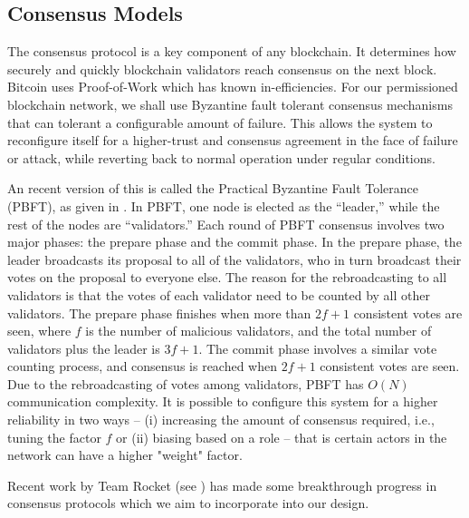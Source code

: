 \subsection{Consensus Models}

The consensus protocol is a key component of any blockchain. It determines how securely and
quickly blockchain validators reach consensus on the next block. Bitcoin uses Proof-of-Work which
has known in-efficiencies. For our permissioned blockchain network, we shall use Byzantine fault tolerant 
consensus mechanisms that can tolerant a configurable amount of failure. This allows the system
to reconfigure itself for a higher-trust and consensus agreement in the face of failure or attack, while
reverting back to normal operation under regular conditions.

An recent version of this is called the Practical Byzantine Fault Tolerance (PBFT), as given in \cite{castro1999}. In
PBFT, one node is elected as the “leader,” while the rest of the nodes are “validators.” Each round of PBFT consensus
involves two major phases: the prepare phase and the commit phase. In the prepare phase, the leader broadcasts its
proposal to all of the validators, who in turn broadcast their votes on the proposal to everyone else. The reason for
the rebroadcasting to all validators is that the votes of each validator need to be counted by all other validators. The
prepare phase finishes when more than $2f + 1$ consistent votes are seen, where $f$ is the number of malicious
validators, and the total number of validators plus the leader is $3f + 1$. The commit phase involves a similar vote
counting process, and consensus is reached when $2f + 1$ consistent votes are seen. Due to the rebroadcasting of votes
among validators, PBFT has $O(N)$ communication complexity. It is possible to configure this system for a higher
reliability in two ways -- (i) increasing the amount of consensus required, i.e., tuning the factor $f$ or (ii) biasing based
on a role -- that is certain actors in the network can have a higher "weight" factor.

Recent work by Team Rocket (see \cite{ava2018}) has made some breakthrough progress in consensus protocols which we aim
to incorporate into our design.

